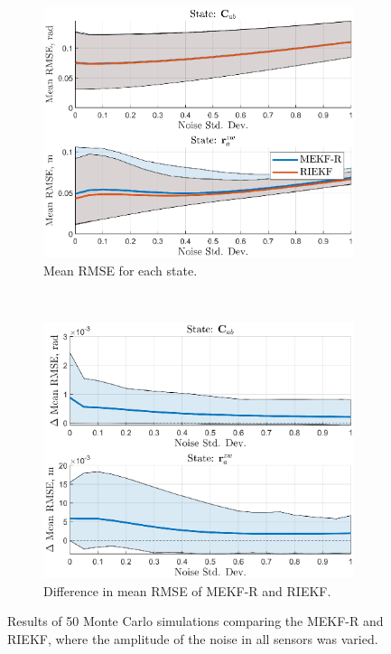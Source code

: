 \begin{figure}
	\centering
	\begin{subfigure}[b]{0.5\textwidth}
		\includegraphics[width=\textwidth]{figs/se3/noise_trials/comp_noise_rmse_state_All_R.eps}
		\caption{Mean RMSE for each state.}
	\end{subfigure}
	~
	\begin{subfigure}[b]{0.5\textwidth}
		\includegraphics[width=\textwidth]{figs/se3/noise_trials/comp_noise_diff_state_All_R.eps}
		\caption{Difference in mean RMSE of MEKF-R and RIEKF.}
	\end{subfigure}
	\caption[Results comparing the MEKF-R and RIEKF varying all sensor noise.]{Results of 50 Monte Carlo simulations comparing the MEKF-R and RIEKF, where the amplitude of the noise in all sensors was varied. }
	\label{fig:comp_noise_all_R}
\end{figure}

